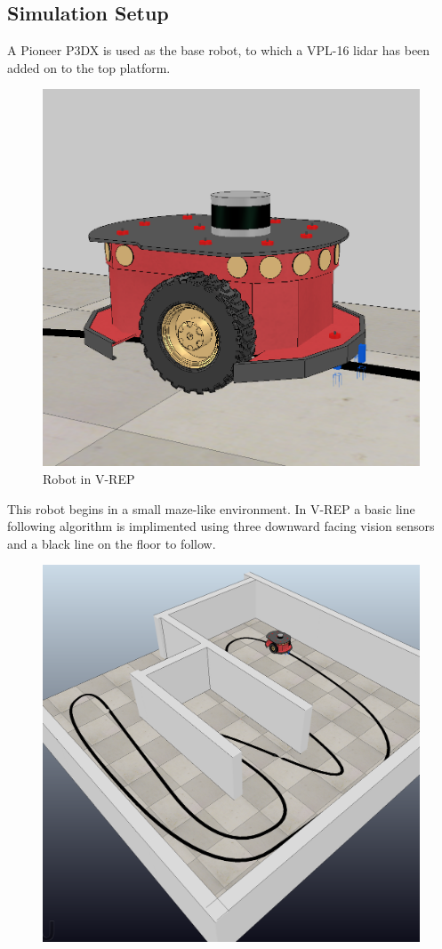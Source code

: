 \documentclass{article}
\begin{document}
\begin{multicols*}{2}
\section{Simulation Setup}
A Pioneer P3DX is used as the base robot, to which a VPL-16 lidar has been added on to the top platform.  
\begin{figure}[H]
  \centering
  \includegraphics[scale=.15]{robot.png} 
  \caption{Robot in V-REP}
\end{figure}
\noindent This robot begins in a small maze-like environment. In V-REP a basic line following algorithm is implimented using three downward facing vision sensors and a black line on the floor to follow. 
\begin{figure}[H]
  \centering
  \includegraphics[scale=.1]{maze.png} 

\end{figure}
\end{multicols*}
\end{document}
